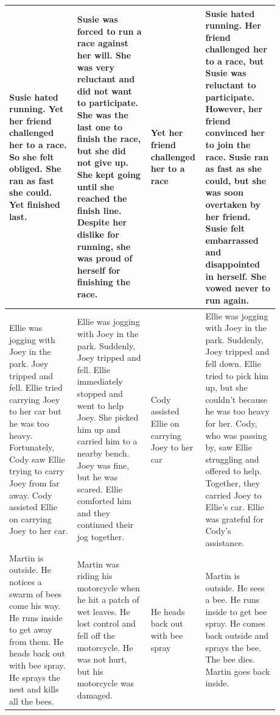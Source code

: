 \begin{table}[htp!]
\begin{tabular}{|p{0.24\linewidth}|p{0.26\linewidth}|p{0.12\linewidth}|p{0.26\linewidth}|}
Susie hated running. Yet her friend challenged her to a race. So she felt obliged. She ran as fast she could. Yet finished last.
& Susie was forced to run a race against her will. She was very reluctant and did not want to participate. She was the last one to finish the race, but she did not give up. She kept going until she reached the finish line. Despite her dislike for running, she was proud of herself for finishing the race.
& Yet her friend challenged her to a race
& Susie hated running. Her friend challenged her to a race, but Susie was reluctant to participate. However, her friend convinced her to join the race. Susie ran as fast as she could, but she was soon overtaken by her friend. Susie felt embarrassed and disappointed in herself. She vowed never to run again. \\ \hline

Ellie was jogging with Joey in the park. Joey tripped and fell. Ellie tried carrying Joey to her car but he was too heavy. Fortunately, Cody saw Ellie trying to carry Joey from far away. Cody assisted Ellie on carrying Joey to her car.
& Ellie was jogging with Joey in the park. Suddenly, Joey tripped and fell. Ellie immediately stopped and went to help Joey. She picked him up and carried him to a nearby bench. Joey was fine, but he was scared. Ellie comforted him and they continued their jog together.
& Cody assisted Ellie on carrying Joey to her car
& Ellie was jogging with Joey in the park. Suddenly, Joey tripped and fell down. Ellie tried to pick him up, but she couldn't because he was too heavy for her. Cody, who was passing by, saw Ellie struggling and offered to help. Together, they carried Joey to Ellie's car. Ellie was grateful for Cody's assistance. \\ \hline

Martin is outside. He notices a swarm of bees come his way. He runs inside to get away from them. He heads back out with bee spray. He sprays the nest and kills all the bees.
& Martin was riding his motorcycle when he hit a patch of wet leaves. He lost control and fell off the motorcycle. He was not hurt, but his motorcycle was damaged.
& He heads back out with bee spray
& Martin is outside. He sees a bee. He runs inside to get bee spray. He comes back outside and sprays the bee. The bee dies. Martin goes back inside. \\ \hline


\end{tabular}
\end{table}
